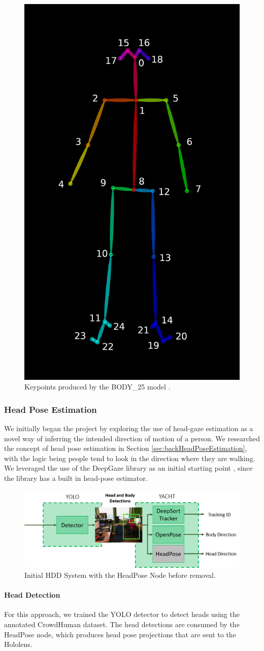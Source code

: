 \begin{figure}[ht]
	\centering
	\includegraphics[width=0.2\linewidth]{img/chapter4_analysis/keypoints_pose_25.png}
	\caption{Keypoints produced by the BODY\_25 model \cite{Cao2017}.}
	\label{fig:bodyKeyPoints}
\end{figure}


\subsubsection{Head Pose Estimation}
We initially began the project by exploring the use of head-gaze estimation as a novel way of inferring the intended direction of motion of a person. We researched the concept of head pose estimation in Section \ref{sec:backHeadPoseEstimation}, with the logic being people tend to look in the direction where they are walking. We leveraged the use of the DeepGaze library as an initial starting point \cite{Patacchiola2017a}, since the library has a built in head-pose estimator. 

\begin{figure}[ht]
	\centering
	\includegraphics[width=1.0\linewidth]{img/chapter4_analysis/hddSystemHeadPose.png}
	\caption{Initial HDD System with the HeadPose Node before removal.}
	\label{fig:headPoseHDD}
	\vspace{-1\baselineskip}
\end{figure}

\paragraph{Head Detection} For this approach, we trained the YOLO detector to detect heads using the annotated CrowdHuman dataset. The head detections are consumed by the HeadPose node, which produces head pose projections that are sent to the Hololens.

